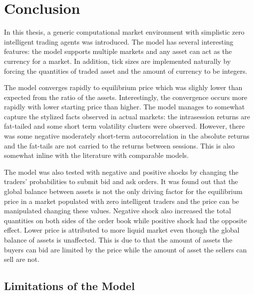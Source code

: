 

\section{Conclusion}

In this thesis, a generic computational market environment with simplistic
zero intelligent trading agents was introduced. The model has several interesting features: 
the model supports multiple markets and any asset can act as the currency
for a market. In addition, tick sizes are implemented naturally by forcing
the quantities of traded asset and the amount of currency to be integers.

The model converges rapidly to equilibrium price which was slighly lower
than expected from the ratio of the assets. Interestingly, the convergence
occurs more rapidly with lower starting price than higher. The model manages 
to somewhat capture the stylized facts observed in actual markets: the intrasession 
returns are fat-tailed and some short term volatility clusters were observed. 
However, there was some negative moderately short-term autocorrelation in the 
absolute returns and the fat-tails are not carried to the returns between sessions. 
This is also somewhat inline with the literature with comparable models.

The model was also tested with negative and positive shocks by changing the 
traders' probabilities to submit bid and ask orders. It was found out that
the global balance between assets is not the only driving factor for the 
equilibrium price in a market populated with zero intelligent traders 
and the price can be manipulated changing these values. Negative shock
also increased the total quantities on both sides of the order book while
positive shock had the opposite effect. Lower price is attributed to 
more liquid market even though the global balance of assets is unaffected.
This is due to that the amount of assets the buyers can bid are limited by the 
price while the amount of asset the sellers can sell are not. 



\subsection{Limitations of the Model}


